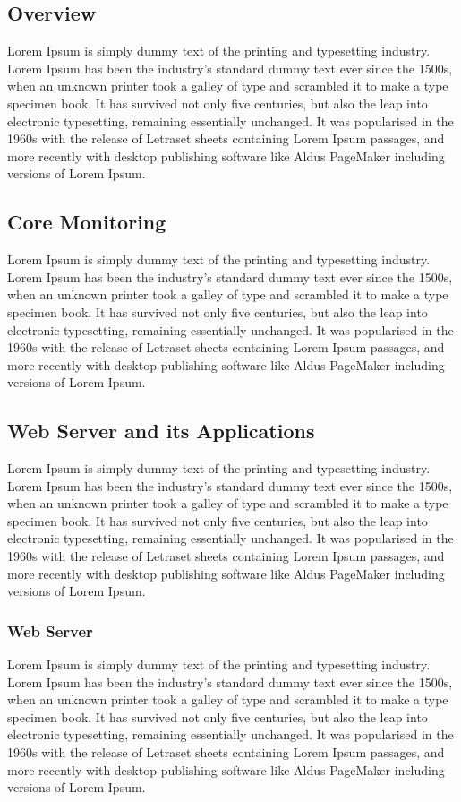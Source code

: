 \subsection{Overview}
Lorem Ipsum is simply dummy text of the printing and typesetting industry. Lorem Ipsum has been the industry's standard dummy text ever since the 1500s, when an unknown printer took a galley of type and scrambled it to make a type specimen book. It has survived not only five centuries, but also the leap into electronic typesetting, remaining essentially unchanged. It was popularised in the 1960s with the release of Letraset sheets containing Lorem Ipsum passages, and more recently with desktop publishing software like Aldus PageMaker including versions of Lorem Ipsum.

\subsection{Core Monitoring}
Lorem Ipsum is simply dummy text of the printing and typesetting industry. Lorem Ipsum has been the industry's standard dummy text ever since the 1500s, when an unknown printer took a galley of type and scrambled it to make a type specimen book. It has survived not only five centuries, but also the leap into electronic typesetting, remaining essentially unchanged. It was popularised in the 1960s with the release of Letraset sheets containing Lorem Ipsum passages, and more recently with desktop publishing software like Aldus PageMaker including versions of Lorem Ipsum.

\subsection{Web Server and its Applications}
Lorem Ipsum is simply dummy text of the printing and typesetting industry. Lorem Ipsum has been the industry's standard dummy text ever since the 1500s, when an unknown printer took a galley of type and scrambled it to make a type specimen book. It has survived not only five centuries, but also the leap into electronic typesetting, remaining essentially unchanged. It was popularised in the 1960s with the release of Letraset sheets containing Lorem Ipsum passages, and more recently with desktop publishing software like Aldus PageMaker including versions of Lorem Ipsum.

\subsubsection{Web Server}
Lorem Ipsum is simply dummy text of the printing and typesetting industry. Lorem Ipsum has been the industry's standard dummy text ever since the 1500s, when an unknown printer took a galley of type and scrambled it to make a type specimen book. It has survived not only five centuries, but also the leap into electronic typesetting, remaining essentially unchanged. It was popularised in the 1960s with the release of Letraset sheets containing Lorem Ipsum passages, and more recently with desktop publishing software like Aldus PageMaker including versions of Lorem Ipsum.

